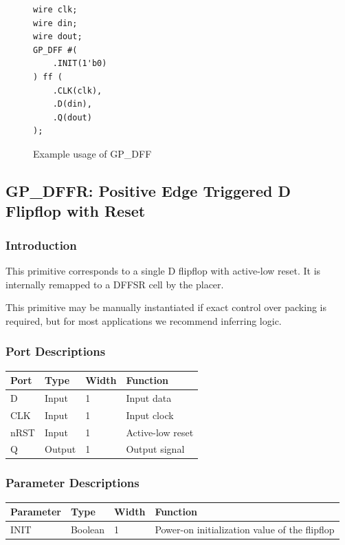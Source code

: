 \documentclass{article}
\begin{document}
\begin{figure}[h]
\begin{lstlisting}
wire clk;
wire din;
wire dout;
GP_DFF #(
	.INIT(1'b0)
) ff (
	.CLK(clk),
	.D(din),
	.Q(dout)
);
\end{lstlisting}
\caption{Example usage of GP\_DFF}
\label{gp-dff-example}
\end{figure}


\pagebreak
\subsection{GP\_DFFR: Positive Edge Triggered D Flipflop with Reset}

\subsubsection{Introduction}
This primitive corresponds to a single D flipflop with active-low reset. It is internally remapped to a DFFSR cell by 
the placer.

This primitive may be manually instantiated if exact control over packing is required, but for most applications we 
recommend inferring logic.

\subsubsection{Port Descriptions}

\begin{tabularx}{4in}{|l|l|l|X|}
\hline
{\bfseries Port} & {\bfseries Type} & {\bfseries Width} & {\bfseries Function} \\
\hline
D & Input & 1 & Input data \\
\hline
CLK & Input & 1 & Input clock \\
\hline
nRST & Input & 1 & Active-low reset \\
\hline
Q & Output & 1 & Output signal \\
\hline
\end{tabularx}

\subsubsection{Parameter Descriptions}

\begin{tabularx}{5in}{|l|l|l|X|}
\hline
{\bfseries Parameter} & {\bfseries Type} & {\bfseries Width} & {\bfseries Function} \\
\hline
INIT & Boolean & 1 & Power-on initialization value of the flipflop \\
\hline
\end{tabularx}
\end{document}
